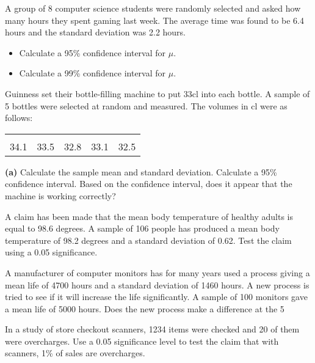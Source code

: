 	\item
	A group of 8 computer science students were randomly selected and asked how many hours they spent gaming last week. The average time was found to be 6.4 hours and the standard deviation was 2.2 hours.
	\begin{itemize}
		\item[{\bf(a)}] Calculate a 95\% confidence interval for $\mu$. \item[{\bf(b)}] Calculate a 99\% confidence interval for $\mu$.
	\end{itemize}
	
	\item 
	Guinness set their bottle-filling machine to put 33cl into each bottle. A sample of 5 bottles were selected at random and measured. The volumes in cl were as follows:\\[-0.2cm]
	\begin{center}
		\begin{tabular}{|ccccc|}
			\hline
			&&&&\\[-0.3cm]
			34.1  & 33.5 & 32.8 & 33.1 & 32.5\\[0.1cm]
			\hline
		\end{tabular}
	\end{center}
	
	
	{\bf(a)} Calculate the sample mean and standard deviation.  Calculate a 95\% confidence interval.   Based on the confidence interval, does it appear that the machine is working correctly?
	
	
	\item A claim has been made that the mean body temperature of healthy adults is equal to 98.6 degrees. 
	A sample of 106 people has produced a mean body temperature of 98.2 degrees and a standard deviation of 0.62. Test the claim using a 0.05 significance.
	
	\item A manufacturer of computer monitors  has for many years used a process giving a mean life of 4700 hours and a standard deviation of 1460 hours. 
	A new process is tried to see if it will increase the life significantly. A sample of 100 monitors gave a mean life of 5000 hours.  
	Does the new process make a difference at the 5%
	
	\item In a study of store checkout scanners, 1234 items were checked and 20 of them were overcharges.
	Use a 0.05 significance level to test the claim that with scanners, 1\% of sales are overcharges.
	

